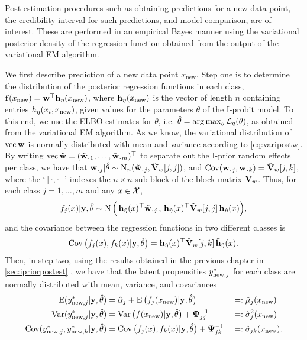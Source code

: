 Post-estimation procedures such as obtaining predictions for a new data point, the credibility interval for such predictions, and model comparison, are of interest.
These are performed in an empirical Bayes manner using the variational posterior density of the regression function obtained from the output of the variational EM algorithm.

We first describe prediction of a new data point $x_{\text{new}}$.
Step one is to determine the distribution of the posterior regression functions in each class, ${\mathbf f}(x_{\text{new}}) = {\mathbf w}^\top{\mathbf h}_\eta(x_{\text{new}})$, where ${\mathbf h}_\eta(x_{\text{new}})$ is the vector of length $n$ containing entries $h_\eta(x_i,x_{\text{new}})$, given values for the parameters $\theta$ of the I-probit model.
To this end, we use the ELBO estimates for $\theta$, i.e. $\hat\theta = \operatorname*{arg\,max}_\theta {\mathcal L}_q(\theta)$, as obtained from the variational EM algorithm.
As we know, the variational distribution of $\operatorname{vec}{\mathbf w}$ is normally distributed with mean and variance according to \cref{eq:varipostw}.
By writing $\vecc \tilde\bw = (\tilde \bw_{\bigcdot 1}, \dots, \tilde \bw_{\bigcdot m})^\top$ to separate out the I-prior random effects per class, we have that $\bw_{\bigcdot j}|\hat\theta \sim \N_n(\tilde \bw_{\bigcdot j}, \tilde\bV_w[j,j])$, and $\Cov(\bw_{\bigcdot j},\bw_{\bigcdot k}) = \tilde\bV_w[j,k]$, where the `$[\cdot,\cdot]$' indexes the $n\times n$ sub-block of the block matrix ${\mathbf V}_w$.
Thus, for each class $j=1,\dots,m$ and any $x \in {\mathcal X}$,
\[
  f_j(x)|\by,\hat\theta \sim \N\Big(\,
  \bh_{\hat\eta}(x)^\top \tilde\bw_{\bigcdot j} \, , \,
  \bh_{\hat\eta}(x)^\top\tilde\bV_w[j,j] \, \bh_{\hat\eta}(x)
  \Big),
\]
and the covariance between the regression functions in two different classes is
\[
  \operatorname{Cov}\big(f_j(x),f_k(x)|{\mathbf y},\hat\theta \big) = 
  {\mathbf h}_{\hat\eta}(x)^\top \tilde{{\mathbf V}}_w[j,k] \, \tilde{{\mathbf h}}_{\hat\eta}(x).
\]
Then, in step two, using the results obtained in the previous chapter in \cref{sec:ipriorpostest} , we have that the latent propensities $y_{{\text{new}},j}^*$ for each class are normally distributed with mean, variance, and covariances
\begin{alignat*}{3}
  \operatorname{E}(y_{{\text{new}},j}^*|{\mathbf y},\hat\theta) 
  &= \hat\alpha_j + \operatorname{E} \big( f_j(x_{\text{new}}) |{\mathbf y},\hat\theta \big)
  &&=: \hat\mu_j(x_\text{new}) \\
  \operatorname{Var}(y_{{\text{new}},j}^*|{\mathbf y},\hat\theta) 
  &= \operatorname{Var}\big(f(x_{\text{new}})|{\mathbf y},\hat\theta \big) + {\bm\Psi}^{-1}_{jj}
  &&=: \hat\sigma_j^2(x_\text{new}) \\
  \operatorname{Cov}(y_{{\text{new}},j}^*,y_{{\text{new}},k}^*|{\mathbf y},\hat\theta)
  &= \operatorname{Cov}\big(f_j(x),f_k(x)|{\mathbf y},\hat\theta \big) + {\bm\Psi}^{-1}_{jk}
  &&=: \hat\sigma_{jk}(x_\text{new}).
\end{alignat*}

